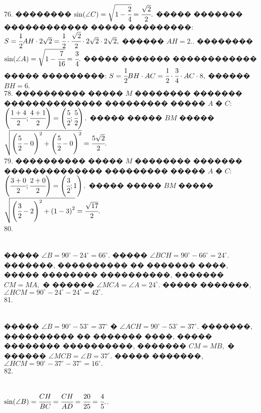 \documentclass[12pt]{article}
\begin{document}
76. �������� $\sin(\angle C)=\sqrt{1-\cfrac{2}{4}}=\cfrac{\sqrt{2}}{2}.$ ����� ������� ������������ ����� ���������: $S=\cfrac{1}{2}AH\cdot 2\sqrt{2}=\cfrac{1}{2}\cdot\cfrac{\sqrt{2}}{2}\cdot 2\sqrt{2}\cdot2\sqrt{2},$ ������ $AH=2.$\newpage{}. �������� $\sin(\angle A)=\sqrt{1-\cfrac{7}{16}}=\cfrac{3}{4}.$ ����� ������� ������������ ����� ���������: $S=\cfrac{1}{2}BH\cdot AC=\cfrac{1}{2}\cdot\cfrac{3}{4}\cdot AC\cdot8,$ ������ $BH=6.$\\
78. ���������� ����� $M$ �������� ������� �������������� ��������� ����� $A$ � $C:$\\$ \left(\cfrac{1+4}{2}; \cfrac{4+1}{2}\right)=\left(\cfrac{5}{2};\cfrac{5}{2}\right).$ ����� ����� $BM$ ����� $\sqrt{\left(\cfrac{5}{2}-0\right)^2+\left(\cfrac{5}{2}-0\right)^2}=\cfrac{5\sqrt{2}}{2}.$\\
79. ���������� ����� $M$ �������� ������� �������������� ��������� ����� $A$ � $C:$\\$ \left(\cfrac{3+0}{2}; \cfrac{2+0}{2}\right)=\left(\cfrac{3}{2};1\right).$ ����� ����� $BM$ ����� $\sqrt{\left(\cfrac{3}{2}-2\right)^2+\left(1-3\right)^2}=\cfrac{\sqrt{17}}{2}.$\\
80. \begin{figure}[ht!]
\end{figure}\\
����� $\angle B=90^\circ-24^\circ=66^\circ.$ ����� $\angle BCH=90^\circ-66^\circ=24^\circ.$ �������, ���������� �� ������� ����, ����� �������� ����������, ������� $CM=MA,$ � ������ $\angle MCA=\angle A=24^\circ.$ ����� �������, $\angle HCM=90^\circ-24^\circ-24^\circ=42^\circ.$\\
81. \begin{figure}[ht!]
\end{figure}\\
����� $\angle B=90^\circ-53^\circ=37^\circ$ � $\angle ACH=90^\circ-53^\circ=37^\circ.$ �������, ���������� �� ������� ����, ����� �������� ����������, ������� $CM=MB,$ � ������ $\angle MCB=\angle B=37^\circ.$ ����� �������, $\angle HCM=90^\circ-37^\circ-37^\circ=16^\circ.$\\
82. \begin{figure}[ht!]
\end{figure}\\
$\sin(\angle B)=\cfrac{CH}{BC}=\cfrac{CH}{AD}=\cfrac{20}{25}=\cfrac{4}{5}.$\newpage{}. \begin{figure}[ht!]
\end{figure}\\
\end{document}
